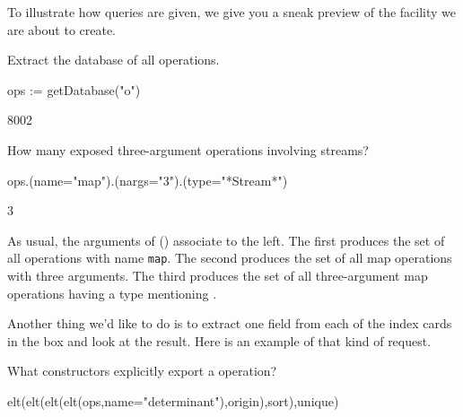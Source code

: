 {{{{{{{To illustrate how queries are given, we give you a sneak preview
of the facility we are about to create.

\begin{xtc}
\begin{xtccomment}
Extract the database of all \Language{} operations.
\end{xtccomment}
\begin{spadsrc}
ops := getDatabase("o")
\end{spadsrc}
\begin{TeXOutput}
\begin{fricasmath}{1}
8002%
\end{fricasmath}
\end{TeXOutput}
\end{xtc}
\begin{xtc}
\begin{xtccomment}
How many exposed three-argument  operations involving streams?
\end{xtccomment}
\begin{spadsrc}
ops.(name="map").(nargs="3").(type="*Stream*")
\end{spadsrc}
\begin{TeXOutput}
\begin{fricasmath}{2}
3%
\end{fricasmath}
\end{TeXOutput}
\end{xtc}

As usual, the arguments of  ()
associate to the left.
The first  produces the set of all operations with
name {\tt map}.
The second  produces the set of all map operations
with three arguments.
The third  produces the set of all three-argument map
operations having a type mentioning .

Another thing we'd like to do is to extract one field from each of
the index cards in the box and look at the result.
Here is an example of that kind of request.

\begin{xtc}
\begin{xtccomment}
What constructors explicitly export a  operation?
\end{xtccomment}
\begin{spadsrc}
elt(elt(elt(elt(ops,name="determinant"),origin),sort),unique)
\end{spadsrc}
\begin{TeXOutput}
\begin{fricasmath}{3}
%
\end{fricasmath}
\end{TeXOutput}
\end{xtc}

}}}}}}}
